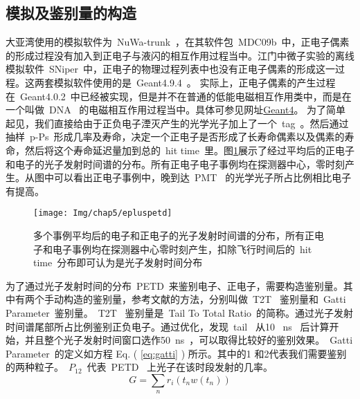 \subsection{模拟及鉴别量的构造}
大亚湾使用的模拟软件为~NuWa-trunk~，在其软件包~MDC09b~中，正电子偶素的形成过程没有加入到正电子与液闪的相互作用过程当中。江门中微子实验的离线模拟软件~SNiper~中，正电子的物理过程列表中也没有正电子偶素的形成这一过程。这两套模拟软件使用的是~Geant4.9.4~。 实际上，正电子偶素的产生过程在~Geant4.0.2~中已经被实现，但是并不在普通的低能电磁相互作用类中，而是在一个叫做~DNA~ 的电磁相互作用过程当中。具体可参见网址\href{www.geant4.org/geant4/support/ReleaseNotes4.9.2.h}{Geant4}。%
为了简单起见，我们直接给由于正负电子湮灭产生的光学光子加上了一个~tag~。然后通过抽样~p-Ps~形成几率及寿命，决定一个正电子是否形成了长寿命偶素以及偶素的寿命，然后将这个寿命延迟量加到总的~hit time~里。图\ref{fig:p56}展示了经过平均后的正电子和电子的光子发射时间谱的分布。所有正电子电子事例均在探测器中心，零时刻产生。从图中可以看出正电子事例中，晚到达~PMT~ 的光学光子所占比例相比电子有提高。
\begin{figure}[!htbp]
  \centering
   \texttt{[image: Img/chap5/epluspetd]}
    \caption{多个事例平均后的电子和正电子的光子发射时间谱的分布，所有正电子和电子事例均在探测器中心零时刻产生，扣除飞行时间后的~hit time~分布即可认为是光子发射时间分布}
  \label{fig:p56}
\end{figure}
为了通过光子发射时间的分布~PETD~来鉴别电子、正电子，需要构造鉴别量。其中有两个手动构造的鉴别量，参考文献\citep{gatti1961new}的方法，分别叫做~T2T~ 鉴别量和~Gatti Parameter~鉴别量。~T2T~ 鉴别量是~Tail To Total Ratio~的简称。通过光子发射时间谱尾部所占比例鉴别正负电子。通过优化，发现~tail~ 从10 ~ns~ 后计算开始，并且整个光子发射时间窗口选作50~ns~，可以取得比较好的鉴别效果。~Gatti Parameter~的定义如方程 Eq. ( \ref{eq:gatti} ) 所示。其中的1 和2代表我们需要鉴别的两种粒子。~$P_{12}$~代表~PETD~ 上光子在该时段发射的几率。
\begin{equation}\label{eq:gatti}
G=\sum_{n}{r_{i}(t_{n}w(t_{n}))}
\end{equation}

